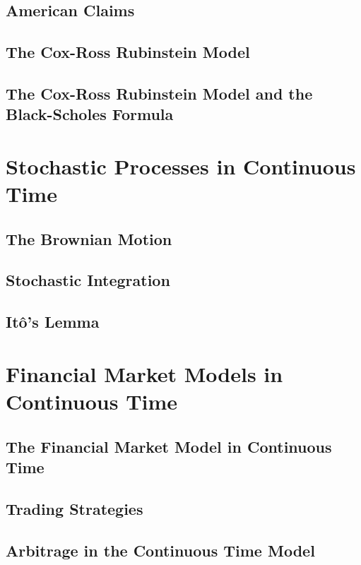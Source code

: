 \documentclass[11pt,a4paper]{article}
\begin{document}
\subsection{American Claims}

\subsection{The Cox-Ross Rubinstein Model}

\subsection{The Cox-Ross Rubinstein Model and the Black-Scholes Formula}

\section{Stochastic Processes in Continuous Time} \label{sec_stochastic_processes_in_continuous_time}

\subsection{The Brownian Motion}

\subsection{Stochastic Integration}

\subsection{It\^o's Lemma}

\section{Financial Market Models in Continuous Time} \label{sec_financial_market_models_in_continuous_time}

\subsection{The Financial Market Model in Continuous Time}

\subsection{Trading Strategies}

\subsection{Arbitrage in the Continuous Time Model}
\end{document}
